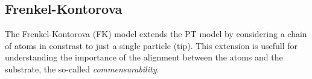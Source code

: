 








\subsection{Frenkel-Kontorova}

The Frenkel-Kontorova (\acrshort{FK}) model \cite{Frenkel_1938} extends the \acrshort{PT} model by considering a chain of atoms in constrast to just a single particle (tip). This extension is usefull for understanding the importance of the alignment between the atoms and the substrate, the so-called \textit{commensurability}.


